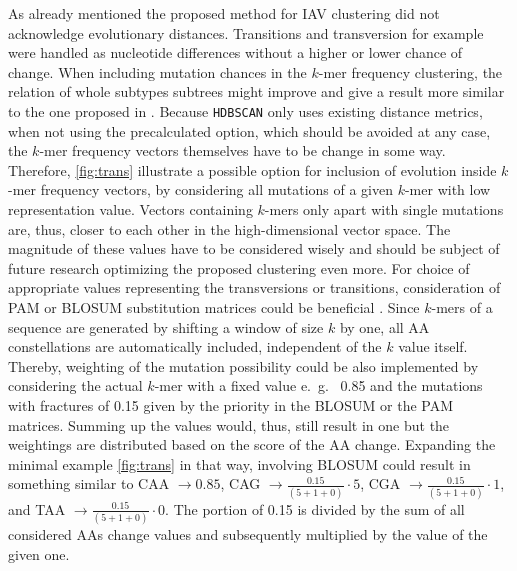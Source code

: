 \vspace{1em}

As already mentioned the proposed method for \gls{IAV} clustering did not acknowledge evolutionary distances. Transitions and transversion for example were handled as nucleotide differences without a higher or lower chance of change. When including mutation chances in the $k$-mer frequency clustering, the relation of whole subtypes subtrees might improve and give a result more similar to the one proposed in \textcite{wei_next-generation_2020}. Because \texttt{HDBSCAN} only uses existing distance metrics, when not using the precalculated option, which should be avoided at any case, the $k$-mer frequency vectors themselves have to be change in some way. Therefore, \autoref{fig:trans} illustrate a possible option for inclusion of evolution inside $k$-mer frequency vectors, by considering all mutations of a given $k$-mer with low representation value. Vectors containing $k$-mers only apart with single mutations are, thus, closer to each other in the high-dimensional vector space. The magnitude of these values have to be considered wisely and should be subject of future research optimizing the proposed clustering even more. For choice of appropriate values representing the transversions or transitions, consideration of PAM or BLOSUM substitution matrices could be beneficial \autocite{mount_comparison_2008}. Since $k$-mers of a sequence are generated by shifting a window of size $k$ by one, all \gls{AA} constellations are automatically included, independent of the $k$ value itself. Thereby, weighting of the mutation possibility could be also implemented by considering the actual $k$-mer with a fixed value e.~g.~ 0.85 and the mutations with fractures of 0.15 given by the priority in the BLOSUM or the PAM matrices. Summing up the values would, thus, still result in one but the weightings are distributed based on the score of the \gls{AA} change. Expanding the minimal example \autoref{fig:trans} in that way, involving BLOSUM could result in something similar to CAA $\rightarrow 0.85$, CAG $\rightarrow \frac{0.15}{(5+1+0)}\cdot 5$, CGA $\rightarrow \frac{0.15}{(5+1+0)}\cdot 1$, and TAA $\rightarrow \frac{0.15}{(5+1+0)}\cdot 0$. The portion of 0.15 is divided by the sum of all considered \glspl{AA} change values and subsequently multiplied by the value of the given one.